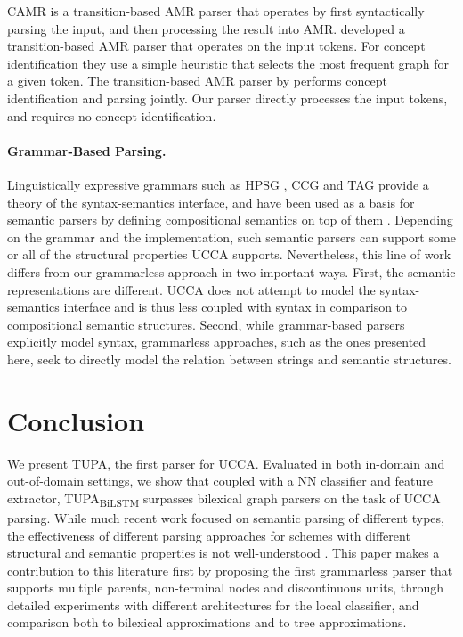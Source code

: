 \documentclass[11pt,a4paper]{article}
\newcommand{\parser}[1]{TUPA\textsubscript{#1}}
\begin{document}
CAMR \cite{wang-xue-pradhan:2015:ACL-IJCNLP,wang2015transition,wang-EtAl:2016:SemEval,goodman2016noise}
is a transition-based AMR parser that operates by first syntactically parsing the input,
and then processing the result into AMR.
\citet{damonte2016incremental} developed a transition-based AMR parser that
operates on the input tokens. For concept identification they use
a simple heuristic that selects the most frequent graph for a given token.
The transition-based AMR parser by \citet{zhou2016amr} performs concept identification
and parsing jointly.
Our parser directly processes the input tokens, and requires no concept identification.

\paragraph{Grammar-Based Parsing.}
Linguistically expressive grammars such as HPSG \cite{PandS:94}, CCG \cite{Steedman:00} and TAG \cite{Joshi:97}
provide a theory of the syntax-semantics interface, and have been used as a basis for semantic parsers
by defining compositional semantics on top of them \cite[among others]{Flic:00,bos2005towards}.
Depending on the grammar and the implementation, such semantic parsers can support
some or all of the structural properties UCCA supports.
Nevertheless, this line of work differs from our grammarless approach in two important ways.
First, the semantic representations are different. UCCA does not attempt to model
the syntax-semantics interface and is thus less coupled with syntax in comparison to
compositional semantic structures.
Second, while grammar-based parsers explicitly model syntax, grammarless
approaches, such as the ones presented here, seek to directly model the relation between
strings and semantic structures.


\section{Conclusion}\label{sec:conclusion}
We present \parser{}, the first parser for UCCA.
Evaluated in both in-domain and out-of-domain settings, we show that coupled with a
NN classifier and feature extractor,
\parser{BiLSTM} surpasses bilexical graph parsers on the task of UCCA parsing.
While much recent work focused on semantic parsing of different types,
the effectiveness of different parsing approaches for schemes with
different structural and semantic properties is not well-understood 
\cite{kuhlmann2016towards}.
This paper makes a contribution to this literature first by proposing the first grammarless parser that supports multiple parents, non-terminal nodes and discontinuous units, through detailed experiments with different architectures for the local classifier, and comparison both to bilexical approximations and to tree approximations.
\end{document}

